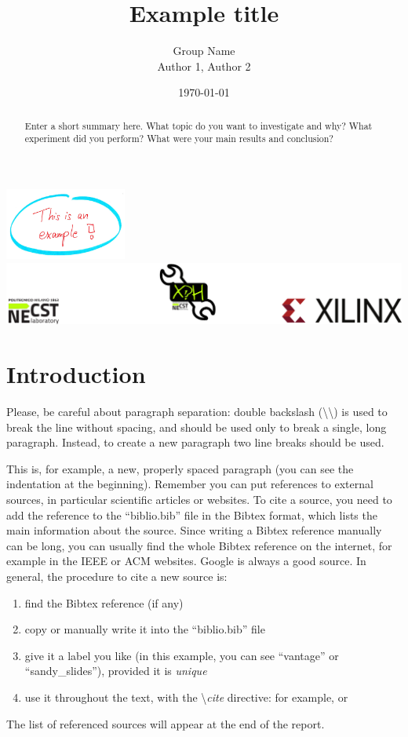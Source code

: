 \documentclass[12pt,oneside,a4paper]{article}
\title{\textbf{Example title}}
\author{Group Name\\Author 1, Author 2}
\date{\today}
\begin{document}
\begin{titlepage}
	\centering
	\clearpage
	\maketitle
	\thispagestyle{empty}
	\vspace*{1cm}
	\includegraphics[width=4cm]{example.jpg} %
	\vfill
	\centering
	\includegraphics{footer.png}
\end{titlepage}


\begin{abstract}
Enter a short summary here. What topic do you want to investigate and why? What experiment did you perform? What were your main results and conclusion?
\end{abstract}

\section{Introduction} \label{sec:intro}
Please, be careful about paragraph separation: double backslash (\textbackslash\textbackslash) is used to break the line without spacing, and should be used only to break a single, long paragraph. Instead, to create a new paragraph two line breaks should be used.

This is, for example, a new, properly spaced paragraph (you can see the indentation at the beginning). Remember you can put references to external sources, in particular scientific articles or websites. To cite a source, you need to add the reference to the ``biblio.bib'' file in the Bibtex format, which lists the main information about the source. Since writing a Bibtex reference manually can be long, you can usually find the whole Bibtex reference on the internet, for example in the IEEE or ACM websites. Google is always a good source. In general, the procedure to cite a new source is:
\begin{enumerate}
	\item find the Bibtex reference (if any)
	\item copy or manually write it into the ``biblio.bib'' file
	\item give it a label you like (in this example, you can see ``vantage'' or ``sandy\_slides''), provided it is \emph{unique}
	\item use it throughout the text, with the \textbackslash \emph{cite} directive: for example, \cite{vantage} or \cite{sandy_slides}
\end{enumerate}
The list of referenced sources will appear at the end of the report.
\end{document}

